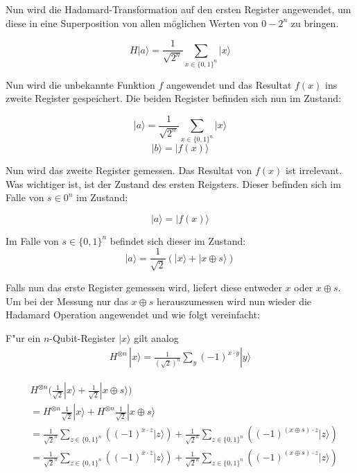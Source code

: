 \begin{refsection}
Nun wird die Hadamard-Transformation auf den ersten Register
angewendet, um diese in eine Superposition von allen möglichen Werten von $0
- 2^n$ zu bringen.  

\[ 
    H|a\rangle=\frac{1}{\sqrt{2^n}} \sum_{x\in\{0,1\}^n}{|x\rangle}
\]
 
Nun wird die unbekannte Funktion $f$ angewendet und das Resultat $f(x)$ ins
zweite Register gespeichert. Die beiden Register befinden sich nun im Zustand:

\[ 
    |a\rangle = \frac{1}{\sqrt{2^n}} \sum_{x\in\{0,1\}^n} {|x\rangle} 
\]
\[
    |b\rangle = |f(x)\rangle
\]

Nun wird das zweite Register gemessen. Das Resultat von $f(x)$ ist irrelevant.
Was wichtiger ist, ist der Zustand des ersten Reigsters.  Dieser befinden sich
im Falle von $s\in0^n$ im Zustand:

\[
    |a\rangle = |f(x)\rangle
\]

Im Falle von $s \in \{0,1\}^n$ befindet sich dieser im Zustand:
\[
    |a\rangle = \frac{1}{\sqrt{2}} ( |x\rangle + |x \oplus s \rangle )
\]

Falls nun das erste Register gemessen wird, liefert diese entweder $x$ oder $x
\oplus s$. Um bei der Messung nur das $x \oplus s$ herauszumessen wird nun
wieder die Hadamard Operation angewendet und wie folgt vereinfacht:

F"ur ein $n$-Qubit-Register $|x\rangle$ gilt analog
\begin{align*}
H^{\otimes n}\, |x\rangle
=
\frac1{(\sqrt{2})^n}
\sum_y (-1)^{x\cdot y}|y\rangle
\end{align*}

\begin{align*}
    &H^{ \otimes n } \biggl( 
                     \frac{1}{\sqrt{2}} |x\rangle + 
                     \frac{1}{\sqrt{2}} |x \oplus s\rangle 
                     \biggr)
    \\
    &= H^{ \otimes n } \frac{1}{\sqrt{2}} |x\rangle + 
       H^{ \otimes n } \frac{1}{\sqrt{2}} |x \oplus s\rangle 
    \\ 
    &= \frac1{\sqrt{2}^n} \sum_{z \in \{0,1\}^n} {( (-1)^{x \cdot z} |z\rangle )} + 
       \frac1{\sqrt{2}^n}  \sum_{z \in \{0,1\}^n} { ( (-1)^{(x \oplus s) \cdot z } |z\rangle)}
    \\
    &= \frac1{\sqrt{2}^n} \sum_{z \in \{0,1\}^n} {( (-1)^{x \cdot z} |z\rangle )} + 
       \frac1{\sqrt{2}^n}  \sum_{z \in \{0,1\}^n} { ( (-1)^{(x \oplus s) \cdot z } |z\rangle)}
\end{align*}



\end{refsection}
